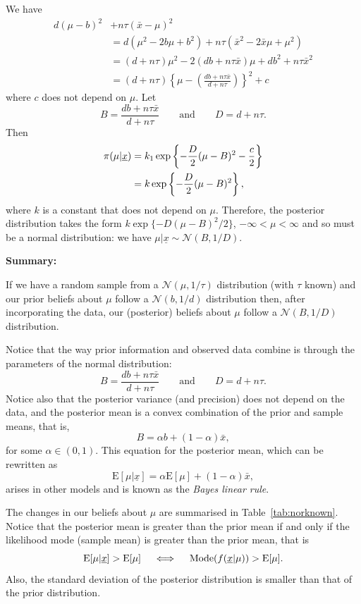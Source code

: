 {{        We have
\begin{align*}
d(\mu-b)^2&+n\tau(\bar x-\mu)^2\\
&=d(\mu^2-2b\mu+b^2)+n\tau(\bar x^2-2\bar x\mu+\mu^2)\\
&=(d+n\tau)\mu^2-2(db+n\tau\bar x)\mu
+db^2+n\tau\bar x^2\\
&=(d+n\tau)\left\{\mu
-\left(\frac{db+n\tau\bar x}{d+n\tau}\right)\right\}^2+c
\end{align*}
where $c$ does not depend on $\mu$.  Let
\begin{equation}
\label{eq:p12}
B=\frac{db+n\tau\bar x}{d+n\tau}\quad\quad\text{and}\quad\quad
D=d+n\tau.
\end{equation}
Then
\begin{align}
\label{eq:p13}
\pi(\mu|\underline{x})&=k_1\exp\left\{-\frac{D}{2}(\mu-B)^2-\frac{c}{2}\right\}
\notag \\
&=k\exp\left\{-\frac{D}{2}(\mu-B)^2\right\},
\end{align}
where $k$ is a constant that does not depend on $\mu$. Therefore, the posterior distribution takes the form $k\exp\{-D(\mu-B)^2/2\}$, $-\infty<\mu<\infty$ and so must be a normal distribution: we have $\mu|\underline{x}\sim \mathcal{N}(B,1/D)$.

    
}

\newpage
\textbf{Summary:}

If we have a random sample from a $\mathcal{N}(\mu,1/\tau)$ distribution (with $\tau$ known) and our prior beliefs about $\mu$ follow a $\mathcal{N}(b,1/d)$ distribution then, after incorporating the data, our (posterior) beliefs about $\mu$ follow a $\mathcal{N}(B,1/D)$ distribution.

Notice that the way prior information and observed data combine is through the parameters of the normal distribution:
\begin{equation*}
B = \frac{db+n\tau\bar x}{d+n\tau}
\quad\quad\text{and}\quad\quad 
D = d+n\tau.
\end{equation*}
Notice also that the posterior variance (and precision) does not depend on the data, and the posterior mean is a convex combination of the prior and sample means, that is,
$$
B=\alpha b+(1-\alpha)\bar x,
$$
for some $\alpha\in(0,1)$. This equation for the posterior mean, which can be rewritten as
$$
\text{E}[\mu|\underline{x}]=\alpha \text{E}[\mu]+(1-\alpha)\bar x,
$$
arises in other models and is known as the \textit{Bayes linear rule}.

The changes in our beliefs about $\mu$ are summarised in Table~\ref{tab:norknown}.  Notice that the posterior mean is greater than the prior mean if and only if the likelihood mode (sample mean) is greater than the prior mean, that is
\begin{equation*}
\text{E}[\mu|\underline{x}] > \text{E}[\mu] \quad\iff\quad \textnormal{Mode}(f(\underline{x}|\mu))>\text{E}[\mu].
\end{equation*}
Also, the standard deviation of the posterior distribution is smaller than that of the prior distribution.

}
